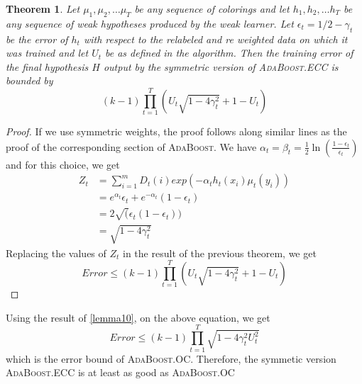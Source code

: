 \documentclass[11pt]{article}
\newtheorem{theorem}{Theorem}
\begin{document}
\begin{theorem}
Let $\mu_1, \mu_2, \ldots \mu_T$ be any sequence of colorings and let $h_1, h_2, \ldots h_T$ be any sequence of weak hypotheses produced by the weak learner. Let $\epsilon_t = 1/2 - \gamma_t$ be the error of $h_t$ with respect to the relabeled and re weighted data on which it was trained and let $U_t$ be as defined in the algorithm. Then the training error of the final hypothesis $H$ output by the symmetric version of \textsc{AdaBoost}.ECC is bounded by 
$$(k-1)\prod_{t=1}^T \left(U_t \sqrt{1-4\gamma_t^2} + 1-U_t\right)$$
\end{theorem}
\begin{proof}
If we use symmetric weights, the proof follows along similar lines as the proof of the corresponding section of \textsc{AdaBoost}. 
We have $\alpha_t = \beta_t = \frac{1}{2} \ln (\frac{1-\epsilon_t}{\epsilon_t})$ and for this choice, we get 
\begin{align*}
Z_t &= \sum_{i=1}^m D_t(i) exp(-\alpha_t h_t(x_i) \mu_t(y_i))\\
&= e^{\alpha_t}\epsilon_t + e^{-\alpha_t}(1-\epsilon_t)\\
&= 2 \sqrt(\epsilon_t(1-\epsilon_t))\\
&= \sqrt{1-4\gamma_t^2}
\end{align*}
Replacing the values of $Z_t$ in the result of the previous theorem, we get
$$Error \le (k-1)\prod_{t=1}^T \left(U_t \sqrt{1-4\gamma_t^2} + 1-U_t\right)$$
\end{proof}
Using the result of \ref{lemma10}, on the above equation, we get
$$Error \le (k-1)\prod_{t=1}^T \sqrt{1-4\gamma_t^2 U_t^2} $$ which is the error bound of \textsc{AdaBoost}.OC. Therefore, the symmetic version \textsc{AdaBoost}.ECC is at least as good as \textsc{AdaBoost}.OC

\printbibliography[heading=bibintoc,title={References}]
\end{document}
